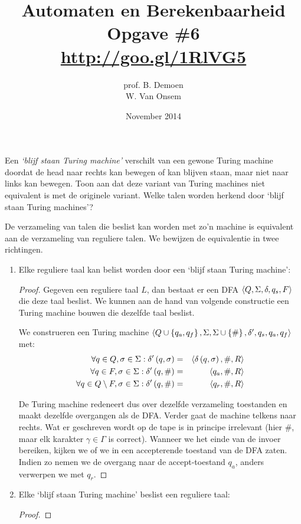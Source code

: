 \documentclass[a4paper]{article}
\title{Automaten en Berekenbaarheid\\Opgave \#6\\\url{http://goo.gl/1RlVG5}}
\author{prof. B. Demoen\\W. Van Onsem}
\date{November 2014}
\begin{document}
\maketitle

\begin{question}
Een \emph{`blijf staan Turing machine'} verschilt van een gewone Turing machine doordat de head naar rechts kan bewegen of kan blijven staan, maar niet naar links kan bewegen. Toon aan dat deze variant van Turing machines niet equivalent is met de originele variant. Welke talen worden herkend door `blijf staan Turing machines'?
\begin{answer}
De verzameling van talen die beslist kan worden met zo'n machine is equivalent aan de verzameling van reguliere talen. We bewijzen de equivalentie in twee richtingen.
\begin{enumerate}
 \item Elke reguliere taal kan belist worden door een `blijf staan Turing machine':
\begin{proof}
Gegeven een reguliere taal $L$, dan bestaat er een DFA $\left\langle Q,\Sigma,\delta,q_s,F \right\rangle$ die deze taal beslist. We kunnen aan de hand van volgende constructie een Turing machine bouwen die dezelfde taal beslist.
\begin{construction}
We construeren een Turing machine $\left\langle Q\cup\left\{ q_a,q_f \right\},\Sigma,\Sigma\cup\left\{ \# \right\},\delta',q_s,q_a,q_f \right\rangle$ met:
\begin{eqnarray}
\forall q\in Q,\sigma\in\Sigma:\delta'\left( q,\sigma \right)&=&\left\langle \delta\left( q,\sigma \right),\#,R \right\rangle\\
\forall q\in F,\sigma\in\Sigma:\delta'\left( q,\# \right)&=&\left\langle q_a,\#,R \right\rangle\\
\forall q\in Q\setminus F,\sigma\in\Sigma:\delta'\left( q,\# \right)&=&\left\langle q_r,\#,R \right\rangle
\end{eqnarray}
\end{construction}
De Turing machine redeneert dus over dezelfde verzameling toestanden en maakt dezelfde overgangen als de DFA. Verder gaat de machine telkens naar rechts. Wat er geschreven wordt op de tape is in principe irrelevant (hier $\#$, maar elk karakter $\gamma\in\Gamma$ is correct). Wanneer we het einde van de invoer bereiken, kijken we of we in een accepterende toestand van de DFA zaten. Indien zo nemen we de overgang naar de accept-toestand $q_a$, anders verwerpen we met $q_r$.
\end{proof}
 \item Elke `blijf staan Turing machine' beslist een reguliere taal:
\begin{proof}

\end{proof}
\end{enumerate}
\end{answer}
\end{question}
\end{document}
